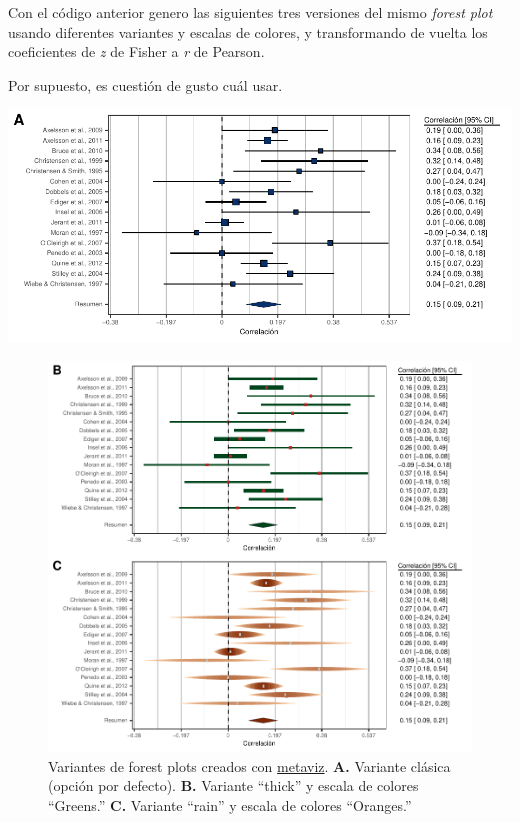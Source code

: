 \documentclass[
  bookmarksnumbered]{article}
\begin{document}
Con el código anterior genero las siguientes tres versiones del mismo \emph{forest plot} usando diferentes variantes y escalas de colores, y transformando de vuelta los coeficientes de \emph{z} de Fisher a \emph{r} de Pearson.

Por supuesto, es cuestión de gusto cuál usar.

\includegraphics{Meta-analysis_files/figure-latex/for-plot3-1.pdf}

\begin{figure}
\centering
\includegraphics{Meta-analysis_files/figure-latex/for-plot3b-1.pdf}
\caption{\label{fig:for-plot3b}Variantes de forest plots creados con \href{https://cran.r-project.org/web/packages/metaviz/vignettes/metaviz.html}{metaviz}. \textbf{A.} Variante clásica (opción por defecto). \textbf{B.} Variante ``thick'' y escala de colores ``Greens.'' \textbf{C.} Variante ``rain'' y escala de colores ``Oranges.''}
\end{figure}
\end{document}
